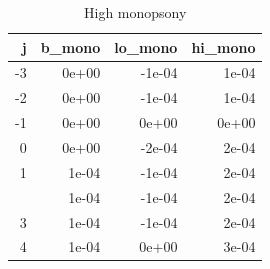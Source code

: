 \begin{table}

\caption{High monopsony}
\centering
\begin{tabular}[t]{rrrr}
\toprule
j & b\_mono & lo\_mono & hi\_mono\\
\midrule
-3 & 0e+00 & -1e-04 & 1e-04\\
-2 & 0e+00 & -1e-04 & 1e-04\\
-1 & 0e+00 & 0e+00 & 0e+00\\
0 & 0e+00 & -2e-04 & 2e-04\\
1 & 1e-04 & -1e-04 & 2e-04\\
\addlinespace
2 & 1e-04 & -1e-04 & 2e-04\\
3 & 1e-04 & -1e-04 & 2e-04\\
4 & 1e-04 & 0e+00 & 3e-04\\
\bottomrule
\end{tabular}
\end{table}
